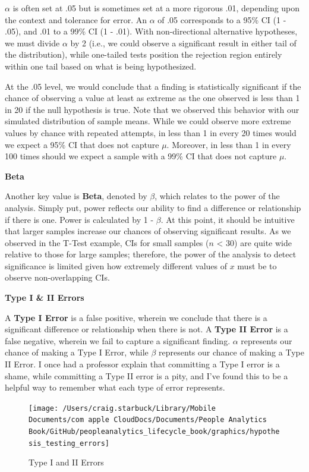 \documentclass[]{book}
\begin{document}
\(\alpha\) is often set at .05 but is sometimes set at a more rigorous .01, depending upon the context and tolerance for error. An \(\alpha\) of .05 corresponds to a 95\% CI (1 - .05), and .01 to a 99\% CI (1 - .01). With non-directional alternative hypotheses, we must divide \(\alpha\) by 2 (i.e., we could observe a significant result in either tail of the distribution), while one-tailed tests position the rejection region entirely within one tail based on what is being hypothesized.

At the .05 level, we would conclude that a finding is statistically significant if the chance of observing a value at least as extreme as the one observed is less than 1 in 20 if the null hypothesis is true. Note that we observed this behavior with our simulated distribution of sample means. While we could observe more extreme values by chance with repeated attempts, in less than 1 in every 20 times would we expect a 95\% CI that does not capture \(\mu\). Moreover, in less than 1 in every 100 times should we expect a sample with a 99\% CI that does not capture \(\mu\).

\textbf{Beta}

Another key value is \textbf{Beta}, denoted by \(\beta\), which relates to the power of the analysis. Simply put, power reflects our ability to find a difference or relationship if there is one. Power is calculated by 1 - \(\beta\). At this point, it should be intuitive that larger samples increase our chances of observing significant results. As we observed in the T-Test example, CIs for small samples (\(n\) \textless{} 30) are quite wide relative to those for large samples; therefore, the power of the analysis to detect significance is limited given how extremely different values of \(x\) must be to observe non-overlapping CIs.

\textbf{Type I \& II Errors}

A \textbf{Type I Error} is a false positive, wherein we conclude that there is a significant difference or relationship when there is not. A \textbf{Type II Error} is a false negative, wherein we fail to capture a significant finding. \(\alpha\) represents our chance of making a Type I Error, while \(\beta\) represents our chance of making a Type II Error. I once had a professor explain that committing a Type I error is a shame, while committing a Type II error is a pity, and I've found this to be a helpful way to remember what each type of error represents.

\begin{figure}

{\centering \texttt{[image: /Users/craig.starbuck/Library/Mobile Documents/com~apple~CloudDocs/Documents/People Analytics Book/GitHub/peopleanalytics\_lifecycle\_book/graphics/hypothesis\_testing\_errors]} 

}

\caption{Type I and II Errors}\label{fig:hyp-errs}
\end{figure}
\end{document}
